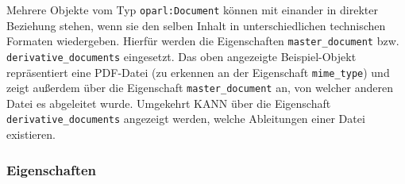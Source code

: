 \documentclass[,a4paper]{article}
\begin{document}
Mehrere Objekte vom Typ \texttt{oparl:Document} können mit einander in
direkter Beziehung stehen, wenn sie den selben Inhalt in
unterschiedlichen technischen Formaten wiedergeben. Hierfür werden die
Eigenschaften \texttt{master\_document} bzw.
\texttt{derivative\_documents} eingesetzt. Das oben angezeigte
Beispiel-Objekt repräsentiert eine PDF-Datei (zu erkennen an der
Eigenschaft \texttt{mime\_type}) und zeigt außerdem über die Eigenschaft
\texttt{master\_document} an, von welcher anderen Datei es abgeleitet
wurde. Umgekehrt KANN über die Eigenschaft
\texttt{derivative\_documents} angezeigt werden, welche Ableitungen
einer Datei existieren.

\subsubsection{Eigenschaften}\label{eigenschaften-6}
\end{document}
